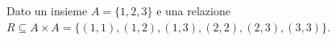 Dato un insieme $A= \{1,2,3\}$ e una relazione $R \subseteq A \times A = \{
(1,1),(1,2),(1,3),(2,2),(2,3),(3,3) \}$.
